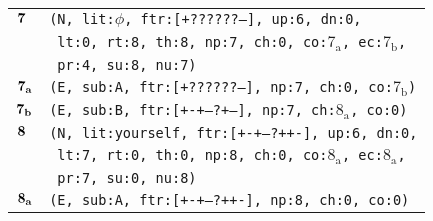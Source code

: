\documentclass{article}
\begin{document}
\begin{minipage}{\textwidth}
{\begin{tabular}{|r|l|}
    ${\textbf{\textrm{7}}_{\phantom{z}}}$ & \texttt{\texttt{(N,~lit:$\phi$,~ftr:[+??????--],~up:6,~dn:0,}} \\
    & \texttt{\texttt{~lt:0,~rt:8,~th:8,~np:7,~ch:0,~co:${\textrm{7}_{\textrm{a}}}$,~ec:${\textrm{7}_{\textrm{b}}}$,}} \\
    & \texttt{\texttt{~pr:4,~su:8,~nu:7)}} \\
    ${\textbf{\textrm{7}}_{\textbf{\textrm{a}}}}$ & \texttt{\texttt{(E,~sub:A,~ftr:[+??????--],~np:7,~ch:0,~co:${\textrm{7}_{\textrm{b}}}$)}} \\
    ${\textbf{\textrm{7}}_{\textbf{\textrm{b}}}}$ & \texttt{\texttt{(E,~sub:B,~ftr:[+-+--?+--],~np:7,~ch:${\textrm{8}_{\textrm{a}}}$,~co:0)}} \\
    ${\textbf{\textrm{8}}_{\phantom{z}}}$ & \texttt{\texttt{(N,~lit:yourself,~ftr:[+-+--?++-],~up:6,~dn:0,}} \\
    & \texttt{\texttt{~lt:7,~rt:0,~th:0,~np:8,~ch:0,~co:${\textrm{8}_{\textrm{a}}}$,~ec:${\textrm{8}_{\textrm{a}}}$,}} \\
    & \texttt{\texttt{~pr:7,~su:0,~nu:8)}} \\
    ${\textbf{\textrm{8}}_{\textbf{\textrm{a}}}}$ & \texttt{\texttt{(E,~sub:A,~ftr:[+-+--?++-],~np:8,~ch:0,~co:0)}} \\
    \hline
  \end{tabular}
  }
\end{minipage}
\bigbreak
\end{document}
